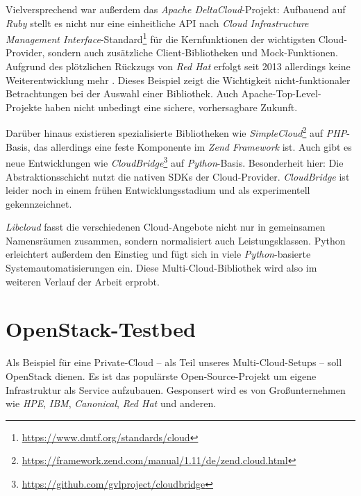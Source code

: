 \noindent Vielversprechend war außerdem das \emph{Apache DeltaCloud}-Projekt: Aufbauend auf \emph{Ruby} stellt es nicht nur eine einheitliche API nach \emph{Cloud Infrastructure Management Interface}-Standard\footnote{\url{https://www.dmtf.org/standards/cloud}} für die Kernfunktionen der wichtigsten Cloud-Provider, sondern auch zusätzliche Client-Bibliotheken und Mock-Funktionen. Aufgrund des plötzlichen Rückzugs von \emph{Red Hat} erfolgt seit 2013 allerdings keine Weiterentwicklung mehr \cite{androu:2013:deltacloud-red-hat-end}. Dieses Beispiel zeigt die Wichtigkeit nicht-funktionaler Betrachtungen bei der Auswahl einer Bibliothek. Auch Apache-Top-Level-Projekte haben nicht unbedingt eine sichere, vorhersagbare Zukunft.

Darüber hinaus existieren spezialisierte Bibliotheken wie \emph{SimpleCloud}\footnote{\url{https://framework.zend.com/manual/1.11/de/zend.cloud.html}} auf \emph{PHP}-Basis, das allerdings eine feste Komponente im \emph{Zend Framework} ist. Auch gibt es neue Entwicklungen wie \emph{CloudBridge}\footnote{\url{https://github.com/gvlproject/cloudbridge}} auf \emph{Python}-Basis. Besonderheit hier: Die Abstraktionsschicht nutzt die nativen SDKs der Cloud-Provider. \emph{CloudBridge} ist leider noch in einem frühen Entwicklungsstadium und als experimentell gekennzeichnet.

\emph{Libcloud} fasst die verschiedenen Cloud-Angebote nicht nur in gemeinsamen Namensräumen zusammen, sondern normalisiert auch Leistungsklassen. Python erleichtert außerdem den Einstieg und fügt sich in viele \emph{Python}-basierte Systemautomatisierungen ein. Diese Multi-Cloud-Bibliothek wird also im weiteren Verlauf der Arbeit erprobt.


\section{OpenStack-Testbed}

Als Beispiel für eine Private-Cloud -- als Teil unseres Multi-Cloud-Setups -- soll OpenStack dienen. Es ist das populärste Open-Source-Projekt um eigene Infrastruktur als Service aufzubauen. Gesponsert wird es von Großunternehmen wie \emph{HPE}, \emph{IBM}, \emph{Canonical}, \emph{Red Hat} und anderen.

